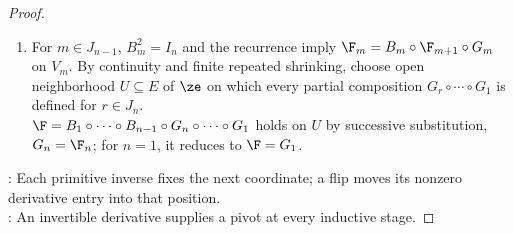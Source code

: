 \begin{theorem}
\begin{proof}
\begin{enumerate}[label=(\roman*)]
Choose open neighborhoods $V_m\subseteq W_m$, $W_{m+1}$ of $\ze$ s.t. $G_m|_{V_m}:V_m\to W_{m+1}$ is $C^1$ diffeomorphism by Theorem \ref{thm:inverse-function-theorem-rn}(i),(iii).\\
Retain this restriction as $G_m$, and define $\F_{m+1}\defeq B_m\circ\F_m\circ G_m^{-1}$ on $W_{m+1}$.\\
The map $\F_{m+1}$ is $C^1$ and fixes $\ze$ by Theorem \ref{thm:inverse-function-theorem-rn}(iii) and the definitions.\\
For $\y\in W_{m+1}$, set $\x\defeq G_m^{-1}(\y)$. Then $y_i=x_i$ for $i<m$ and $y_m=\alpha_k(\x)$ by the definition of $G_m$.\\
The first $m$ components of $B_m\F_m(\x)$ are $y_1,\ldots,y_m$ by the induction hypothesis and the definition of $B_m$; hence $P_m\circ\F_{m+1}=P_m$.\\
Since $DB_m(\ze)=B_m$, $D\F_{m+1}(\ze)=B_mD\F_m(\ze)(DG_m(\ze))^{-1}$ by Definition \ref{def:total-derivative-rn-rm} and Theorems \ref{thm:chain-rule-several-variables}(ii), \ref{thm:inverse-function-theorem-rn}(ii).\\
Every factor is invertible, so $D\F_{m+1}(\ze)$ is invertible. This completes the induction for $m=1,\ldots,n-1$.\\
Set $V_n\defeq W_n$ and $G_n\defeq\F_n$. Since $P_{n-1}\circ\F_n=P_{n-1}$, $G_n$ is primitive in coordinate $n$.\\
The identities $G_n(\ze)=\ze$ and $J_{G_n}(\ze)\neq0$ hold by the induction invariant and Corollary \ref{cor:jacobian-nonzero-iff-derivative-invertible}. Hence (i) holds.
\item For $m\in J_{n-1}$, $B_m^2=I_n$ and the recurrence imply $\F_m=B_m\circ\F_{m+1}\circ G_m$ on $V_m$. By continuity and finite repeated shrinking, choose open neighborhood $U\subseteq E$ of $\ze$ on which every partial composition $G_r\circ\cdots\circ G_1$ is defined for $r\in J_n$.\\
$\F=B_1\circ\cdots\circ B_{n-1}\circ G_n\circ\cdots\circ G_1$ holds on $U$ by successive substitution, $G_n=\F_n$; for $n=1$, it reduces to $\F=G_1$.
\end{enumerate}
: Each primitive inverse fixes the next coordinate; a flip moves its nonzero derivative entry into that position.\\
: An invertible derivative supplies a pivot at every inductive stage.
\end{proof}
\end{theorem}

